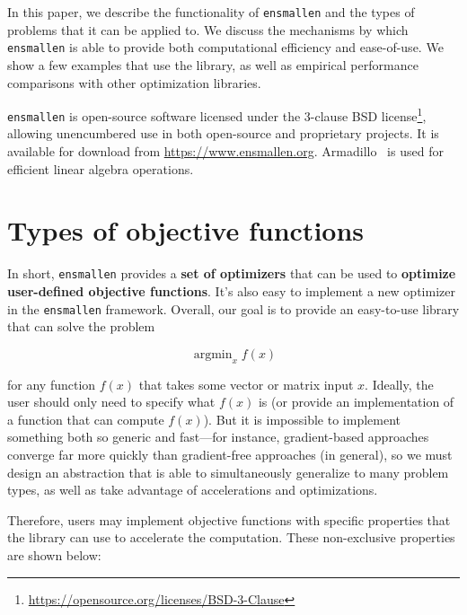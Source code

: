 \documentclass{article}
\begin{document}
In this paper, we describe the functionality of {\tt ensmallen} and the types of
problems that it can be applied to.  We discuss the mechanisms by which {\tt ensmallen} is
able to provide both computational efficiency and ease-of-use.
We show a few examples that use the library, as well as empirical performance comparisons
with other optimization libraries.

{\tt ensmallen} is open-source software licensed under the 3-clause BSD
license\footnote{\url{https://opensource.org/licenses/BSD-3-Clause}},
allowing unencumbered use in both open-source and proprietary projects.
It is available for download from \url{https://www.ensmallen.org}.
Armadillo~\cite{sanderson2016armadillo} is used for efficient linear algebra operations.


\section{Types of objective functions}

In short, {\tt ensmallen} provides a {\bf set of optimizers} that can be used to
{\bf optimize user-defined objective functions}.  It's also easy to implement a
new optimizer in the {\tt ensmallen} framework.  Overall, our goal is to provide
an easy-to-use library that can solve the problem

\begin{equation}
\operatorname{argmin}_{x} f(x)
\end{equation}

\noindent for any function $f(x)$ that takes some vector or matrix input $x$.  Ideally,
the user should only need to specify what $f(x)$ is (or provide an
implementation of a function that can compute $f(x)$).  But it is impossible to
implement something both so generic and fast---for instance, gradient-based
approaches converge far more quickly than gradient-free approaches (in general),
so we must design an abstraction that is able to simultaneously generalize to
many problem types, as well as take advantage of accelerations and
optimizations.

Therefore, users may implement objective functions with specific properties that
the library can use to accelerate the computation.  These non-exclusive
properties are shown below:
\end{document}
